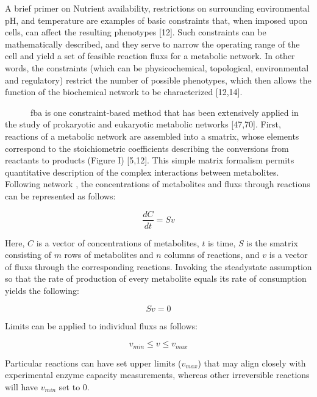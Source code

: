 \begin{pabox}[label=trends:box:fba]{A brief primer on }
Nutrient availability, restrictions on surrounding 
environmental pH, and temperature are examples of basic 
constraints that, when imposed upon cells, can affect 
the resulting phenotypes [12]. Such constraints can 
be mathematically described, and they serve to narrow 
the operating range of the cell and yield a set of feasible 
reaction \glspl{flux} for a metabolic network. In other words, 
the constraints (which can be physicochemical, 
topological, environmental and regulatory) restrict 
the number of possible phenotypes, which then allows 
the function of the biochemical network to be 
characterized [12,14].

~~~~~~\gls{fba} is one constraint-based 
method that has been extensively applied in the study 
of prokaryotic and eukaryotic metabolic networks [47,70]. 
First, reactions of a metabolic network are assembled 
into a \gls{smatrix}, whose elements 
correspond to the stoichiometric coefficients describing 
the conversions from reactants to products (Figure I) [5,12]. 
This simple matrix formalism permits quantitative 
description of the complex interactions between metabolites. 
Following network , the concentrations of 
metabolites and \glspl{flux} through reactions can be represented 
as follows:

\begin{equation} \label{trends:eq:massbalance}
\frac{dC}{dt} = S v
\end{equation}

Here, $C$ is a vector of concentrations of metabolites, $t$ is 
time, $S$ is the \gls{smatrix} consisting of $m$ rows 
of metabolites and $n$ columns of reactions, and $v$ is a 
vector of \glspl{flux} through the corresponding reactions. 
Invoking the \gls{steadystate} assumption so that the rate 
of production of every metabolite equals its rate of 
consumption yields the following:

\begin{equation} \label{trends:eq:steadystate}
Sv = 0
\end{equation}

Limits can be applied to individual \glspl{flux} as follows:

\begin{equation*}
v_{min} \leq v \leq v_{max}
\end{equation*}

Particular reactions can have set upper limits ($v_{max}$) that 
may align closely with experimental enzyme capacity measurements, 
whereas other irreversible reactions will have $v_{min}$ set to 0.


\end{pabox}
